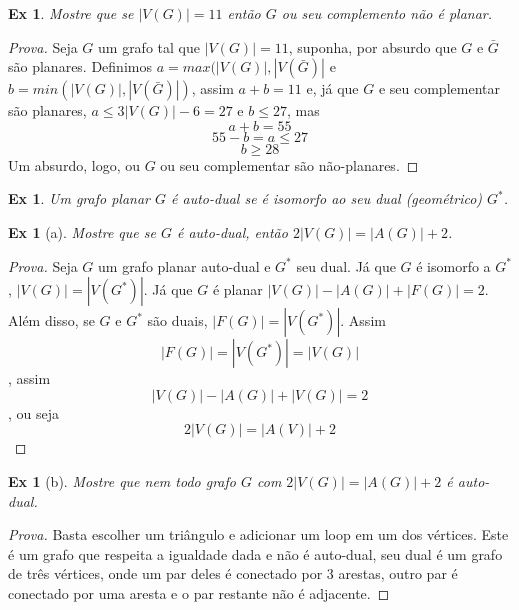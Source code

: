 \documentclass[12pt]{article}
\newcounter{exCounter}
\newtheorem{ex}[exCounter]{Ex}
\begin{document}
\begin{ex}
Mostre que se $|V(G)| = 11$ então $G$ ou seu complemento não é planar.
\end{ex}

\begin{proof}[Prova]
Seja $G$ um grafo tal que $|V(G)| = 11$, suponha, por absurdo que $G$ e $\bar{G}$ são planares. Definimos $a = max(|V(G)|, |V(\bar{G})|$ e $b = min(|V(G)|, |V(\bar{G})|)$, assim $a + b = 11$ e, já que $G$ e seu complementar são planares, $a \leq 3|V(G)| - 6 = 27$ e $b \leq 27$, mas
$$ a+b = 55 $$
$$ 55-b = a \leq 27 $$
$$ b \geq 28 $$
Um absurdo, logo, ou $G$ ou seu complementar são não-planares.
\end{proof}

\begin{ex}
Um grafo planar $G$ é \textit{auto-dual} se é isomorfo ao seu dual (geométrico) $G^*$.
\end{ex}

\setcounter{exCounter}{34}
\begin{ex}[a]
Mostre que se $G$ é auto-dual, então $2|V(G)| = |A(G)| + 2$.
\end{ex}

\begin{proof}[Prova]
Seja $G$ um grafo planar auto-dual e $G^*$ seu dual. Já que $G$ é isomorfo a $G^*$, $|V(G)| = |V(G^*)|$. Já que $G$ é planar $|V(G)| - |A(G)| + |F(G)| = 2$. Além disso, se $G$ e $G^*$ são duais, $|F(G)| = |V(G^*)|$. Assim
$$ |F(G)| = |V(G^*)| = |V(G)| $$, assim
$$ |V(G)| - |A(G)| + |V(G)| = 2 $$, ou seja
$$ 2|V(G)| = |A(V)| + 2 $$
\end{proof}

\setcounter{exCounter}{34}
\begin{ex}[b]
Mostre que nem todo grafo $G$ com $2|V(G)| = |A(G)| + 2$ é auto-dual.
\end{ex}

\begin{proof}[Prova]
Basta escolher um triângulo e adicionar um loop em um dos vértices. Este é um grafo que respeita a igualdade dada e não é auto-dual, seu dual é um grafo de três vértices, onde um par deles é conectado por 3 arestas, outro par é conectado por uma aresta e o par restante não é adjacente.
\end{proof}
\end{document}
